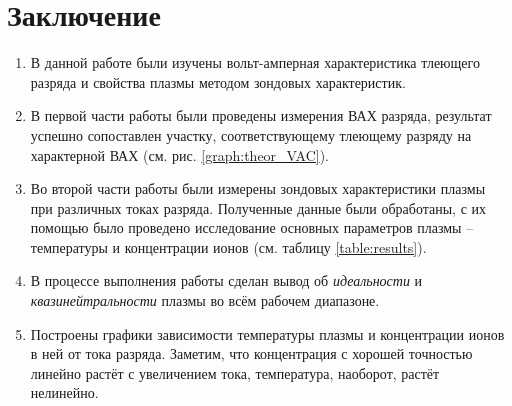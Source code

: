 \documentclass[a4paper, 12pt]{article}
\begin{document}
    \section{Заключение}

    \begin{enumerate}
        \item В данной работе были изучены вольт-амперная характеристика тлеющего разряда и свойства плазмы методом зондовых характеристик.

        \item В первой части работы были проведены измерения ВАХ разряда, результат успешно сопоставлен участку, соответствующему тлеющему разряду на характерной ВАХ (см. рис. \ref{graph:theor_VAC}).

        \item Во второй части работы были измерены зондовых характеристики плазмы при различных токах разряда. Полученные данные были обработаны, с их помощью было проведено исследование основных параметров плазмы -- температуры и концентрации ионов (см. таблицу \ref{table:results}).

        \item В процессе выполнения работы сделан вывод об \textit{идеальности} и \textit{квазинейтральности} плазмы во всём рабочем диапазоне.

        \item Построены графики зависимости температуры плазмы и концентрации ионов в ней от тока разряда. Заметим, что концентрация с хорошей точностью линейно растёт с увеличением тока, температура, наоборот, растёт нелинейно.
    \end{enumerate}
\end{document}
